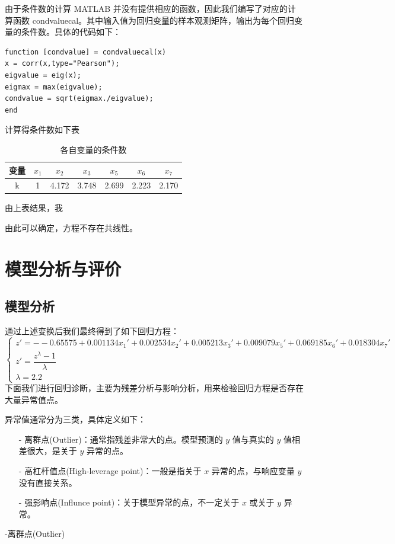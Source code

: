 \documentclass[11pt]{article}
\begin{document}
由于条件数的计算 MATLAB 并没有提供相应的函数，因此我们编写了对应的计算函数 condvaluecal。其中输入值为回归变量的样本观测矩阵，输出为每个回归变量的条件数。具体的代码如下：
\begin{lstlisting}
function [condvalue] = condvaluecal(x)
x = corr(x,type="Pearson");
eigvalue = eig(x);
eigmax = max(eigvalue);
condvalue = sqrt(eigmax./eigvalue);
end
\end{lstlisting}

计算得条件数如下表
\begin{table}[H]
	\centering
	\caption{各自变量的条件数}
	\begin{tabular}{ccccccc}
		\hline
		变量& $x_1$    & $x_2$    & $x_3$  &   $x_5$    & $x_6$    & $x_7$  \\
		\hline
		k&1& 4.172&3.748&2.699&2.223&2.170\\
		\hline
	\end{tabular}
\end{table}
由上表结果，我

由此可以确定，方程不存在共线性。

\section{模型分析与评价}
\subsection{模型分析}
通过上述变换后我们最终得到了如下回归方程：
$$
\left\{\begin{array}{l}
z'=--0.65575+0.001134x_1'+0.002534x_2'+0.005213x_3'+0.009079x_5'+0.069185x_6'+0.018304x_7'\\
z'=\dfrac{z^\lambda-1}{\lambda}\\
\lambda=2.2
\end{array}\right.
$$
下面我们进行回归诊断，主要为残差分析与影响分析，用来检验回归方程是否存在大量异常值点。

异常值通常分为三类，具体定义如下：
\begin{itemize}
    \item[-]离群点(Outlier)：通常指残差非常大的点。模型预测的 $y$ 值与真实的 $y$ 值相差很大，是关于 $y$ 异常的点。
    \item[-]高杠杆值点(High-leverage point)：一般是指关于 $x$ 异常的点，与响应变量 $y$ 没有直接关系。
    \item[-]强影响点(Influnce point)：关于模型异常的点，不一定关于 $x$ 或关于 $y$ 异常。
\end{itemize}
-离群点(Outlier)
\end{document}
